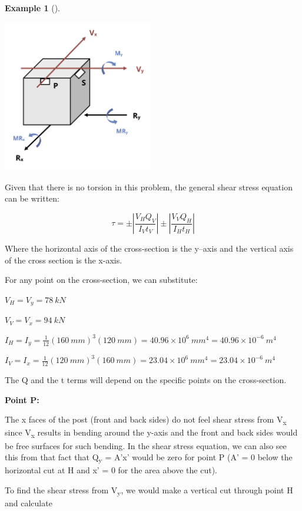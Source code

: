 \documentclass[
  letterpaper,
  DIV=11,
  numbers=noendperiod]{scrreprt}
\theoremstyle{definition}
\newtheorem{example}{Example}[chapter]
\theoremstyle{remark}
\begin{document}
\begin{tcolorbox}
\begin{example}[]
\begin{tcolorbox}
\begin{center}
\includegraphics[width=2.57292in,height=\textheight]{images/CH14 PNGs/example 14.5 part 2.png}
\end{center}

Given that there is no torsion in this problem, the general shear stress
equation can be written:

\[
\tau= \pm\left|\frac{V_H Q_V}{I_V t_V}\right| \pm\left|\frac{V_V Q_H}{I_H t_H}\right|
\]

Where the horizontal axis of the cross-section is the y--axis and the
vertical axis of the cross section is the x-axis.

For any point on the cross-section, we can substitute:

\(V_H = V_y = 78{~kN}\)

\(V_V = V_x = 94{~kN}\)

\(I_H=I_y=\frac{1}{12}(160{~mm})^3(120{~mm})=40.96 \times 10^6{~mm}^4=40.96 \times 10^{-6}{~m}^4\)

\(I_V=I_x=\frac{1}{12}(120{~mm})^3(160{~mm})=23.04 \times10^6{~mm}^4=23.04 \times 10^{-6}{~m}^4\)

The Q and the t terms will depend on the specific points on the
cross-section.

\textbf{Point P:}

The x faces of the post (front and back sides) do not feel shear stress
from V\textsubscript{x} since V\textsubscript{x} results in bending
around the y-axis and the front and back sides would be free surfaces
for such bending. In the shear stress equation, we can also see this
from that fact that Q\textsubscript{y} = A'x' would be zero for point P
(A' = 0 below the horizontal cut at H and x' = 0 for the area above the
cut).

To find the shear stress from V\textsubscript{y}, we would make a
vertical cut through point H and calculate


\end{tcolorbox}
\end{example}
\end{tcolorbox}
\end{document}
